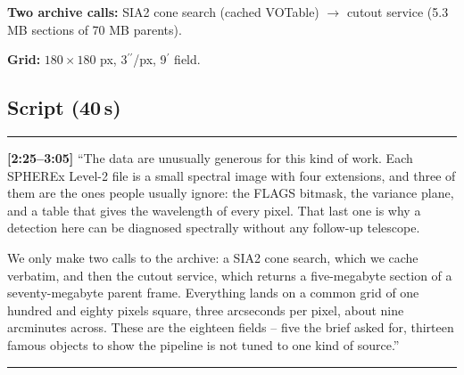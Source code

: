 \documentclass[11pt,a4paper]{article}
\newcommand{\arcmin}{\ensuremath{{}^{\prime}}}
\newcommand{\arcsec}{\ensuremath{{}^{\prime\prime}}}
\begin{document}
\textbf{Two archive calls:} SIA2 cone search (cached VOTable) $\to$ cutout service (5.3 MB sections
of 70 MB parents).

\textbf{Grid:} $180\times180$ px, 3\arcsec/px, 9\arcmin{} field.

\begin{center}
\end{center}

\subsection*{Script (40\,s)}
\noindent\rule{\linewidth}{0.3pt}\par\smallskip\noindent
\textbf{[2:25--3:05]} ``The data are unusually generous for this kind of work. Each SPHEREx Level-2 file
is a small spectral image with four extensions, and three of them are the ones people usually ignore:
the FLAGS bitmask, the variance plane, and a table that gives the wavelength of every pixel. That last
one is why a detection here can be diagnosed spectrally without any follow-up telescope.

We only make two calls to the archive: a SIA2 cone search, which we cache verbatim, and then the cutout
service, which returns a five-megabyte section of a seventy-megabyte parent frame. Everything lands on
a common grid of one hundred and eighty pixels square, three arcseconds per pixel, about nine arcminutes
across. These are the eighteen fields -- five the brief asked for, thirteen famous objects to show the
pipeline is not tuned to one kind of source.''
\par\smallskip\noindent\rule{\linewidth}{0.3pt}
\end{document}
